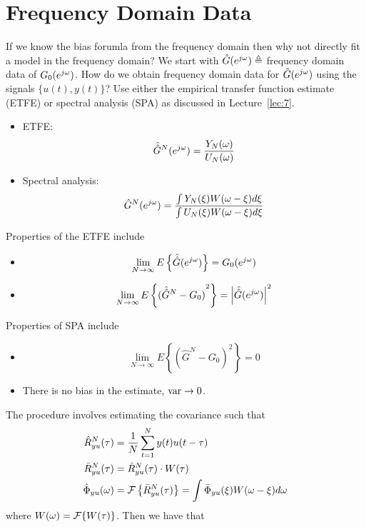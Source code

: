 \section{Frequency Domain Data}
If we know the bias forumla from the frequency domain then why not directly fit a model in the frequency domain? We start with $\hat{G}(e^{j\omega}) \triangleq$ frequency domain data of $G_0(e^{j\omega})$.
How do we obtain frequency domain data for $\hat{G}(e^{j\omega})$ using the signals $\{u(t),y(t)\}$? Use either the empirical transfer function estimate (ETFE) or spectral analysis (SPA) as discussed in Lecture~\ref{lec:7}.
\begin{itemize}
\item ETFE\@:
  \begin{equation*}
\hat{\hat{G}}^N(e^{j\omega}) = \frac{Y_N(\omega)}{U_N(\omega)}
  \end{equation*}
\item Spectral analysis:
  \begin{equation*}
\hat{G}^N(e^{j\omega}) = \frac{\int Y_N(\xi)W(\omega-\xi)d\xi}{\int U_N(\xi)W(\omega-\xi)d\xi}
  \end{equation*}
\end{itemize}
Properties of the ETFE include
\begin{itemize}
\item
  \begin{equation*}
    \lim_{N\to\infty}E\left\lbrace \hat{\hat{G}}(e^{j\omega})\right\rbrace = G_0(e^{j\omega})
  \end{equation*}
\item
  \begin{equation*}
    \lim_{N\to\infty}E\left\lbrace {(\hat{\hat{G}}^N-G_0)}^2\right\rbrace = \left|\hat{\hat{G}}(e^{j\omega})\right|^2
  \end{equation*}
\end{itemize}
Properties of SPA include
\begin{itemize}
\item
  \begin{equation*}
    \lim_{N\to\infty}E\left\lbrace {(\hat{G}^N-G_0)}^2\right\rbrace = 0
  \end{equation*}
\item There is no bias in the estimate, $\text{var}\to0$.
\end{itemize}
The procedure involves estimating the covariance such that
\begin{align*}
\hat{R}_{yu}^N(\tau) &= \frac{1}{N}\sum_{t=1}^N y(t)u(t-\tau) \\
\bar{R}_{yu}^N(\tau) &= \hat{R}_{yu}^N(\tau)\cdot W(\tau) \\
\hat{\Phi}_{yu}(\omega) &= \mathcal{F}\left\lbrace \bar{R}_{yu}^N(\tau)\right\rbrace = \int\bar{\Phi}_{yu}(\xi) W(\omega-\xi)d\omega
\end{align*}
where $W(\omega) = \mathcal{F}\{W(\tau)\}$.
Then we have that

